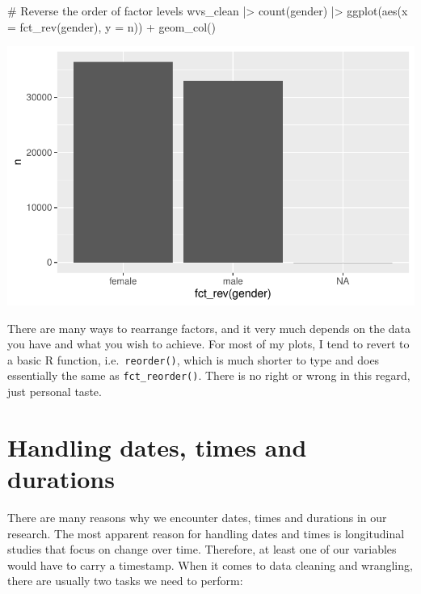 \documentclass[
  letterpaper,
]{krantz}
\makeatletter
\newenvironment{Shaded}{\begin{snugshade}}{\end{snugshade}}
\newcommand{\AttributeTok}[1]{\textcolor[rgb]{0.40,0.45,0.13}{#1}}
\newcommand{\CommentTok}[1]{\textcolor[rgb]{0.37,0.37,0.37}{#1}}
\newcommand{\FunctionTok}[1]{\textcolor[rgb]{0.28,0.35,0.67}{#1}}
\newcommand{\NormalTok}[1]{\textcolor[rgb]{0.00,0.23,0.31}{#1}}
\newcommand{\SpecialCharTok}[1]{\textcolor[rgb]{0.37,0.37,0.37}{#1}}
\newenvironment{kframe}{%
\medskip{}
\setlength{\fboxsep}{.8em}
 \def\at@end@of@kframe{}%
 \ifinner\ifhmode%
  \def\at@end@of@kframe{\end{minipage}}%
  \begin{minipage}{\columnwidth}%
 \fi\fi%
 \def\FrameCommand##1{\hskip\@totalleftmargin \hskip-\fboxsep
 \colorbox{shadecolor}{##1}\hskip-\fboxsep
     \hskip-\linewidth \hskip-\@totalleftmargin \hskip\columnwidth}%
 \MakeFramed {\advance\hsize-\width
   \@totalleftmargin\z@ \linewidth\hsize
   \@setminipage}}%
 {\par\unskip\endMakeFramed%
 \at@end@of@kframe}
\renewenvironment{Shaded}{\begin{kframe}}{\end{kframe}}
\makeatother
\begin{document}
\begin{Shaded}
\begin{Highlighting}[]
\CommentTok{\# Reverse the order of factor levels}
\NormalTok{wvs\_clean }\SpecialCharTok{|\textgreater{}}
  \FunctionTok{count}\NormalTok{(gender) }\SpecialCharTok{|\textgreater{}}
  \FunctionTok{ggplot}\NormalTok{(}\FunctionTok{aes}\NormalTok{(}\AttributeTok{x =} \FunctionTok{fct\_rev}\NormalTok{(gender),}
             \AttributeTok{y =}\NormalTok{ n)) }\SpecialCharTok{+}
  \FunctionTok{geom\_col}\NormalTok{()}
\end{Highlighting}
\end{Shaded}

\includegraphics{07_data_wrangling_files/figure-pdf/reverse-order-1.pdf}

There are many ways to rearrange factors, and it very much depends on
the data you have and what you wish to achieve. For most of my plots, I
tend to revert to a basic R function, i.e.~\texttt{reorder()}, which is
much shorter to type and does essentially the same as
\texttt{fct\_reorder()}. There is no right or wrong in this regard, just
personal taste.

\section{Handling dates, times and
durations}\label{sec-handling-dates-times-and-durations}

There are many reasons why we encounter dates, times and durations in
our research. The most apparent reason for handling dates and times is
longitudinal studies that focus on change over time. Therefore, at least
one of our variables would have to carry a timestamp. When it comes to
data cleaning and wrangling, there are usually two tasks we need to
perform:
\end{document}
